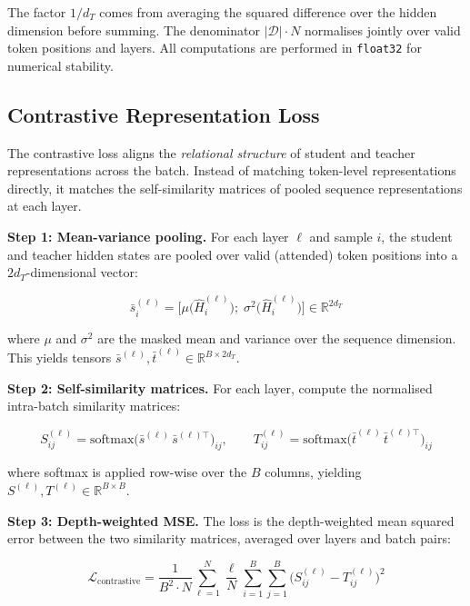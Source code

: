 \documentclass[11pt,a4paper]{article}
\begin{document}
The factor $1/d_T$ comes from averaging the squared difference over the hidden dimension before
summing.  The denominator $|\mathcal{D}| \cdot N$ normalises jointly over valid token positions and
layers.  All computations are performed in \texttt{float32} for numerical stability.

\subsection{Contrastive Representation Loss}
\label{sec:contrastive_loss}

The contrastive loss aligns the \emph{relational structure} of student and teacher representations
across the batch.  Instead of matching token-level representations directly, it matches the
self-similarity matrices of pooled sequence representations at each layer.

\textbf{Step 1: Mean-variance pooling.}
For each layer $\ell$ and sample $i$, the student and teacher hidden states are pooled over valid
(attended) token positions into a $2d_T$-dimensional vector:

\begin{equation}
  \bar{s}_i^{(\ell)} = \bigl[\mu\bigl(\hat{H}_i^{(\ell)}\bigr);\; \sigma^2\bigl(\hat{H}_i^{(\ell)}\bigr)\bigr]
  \in \mathbb{R}^{2d_T}
\end{equation}

where $\mu$ and $\sigma^2$ are the masked mean and variance over the sequence dimension.
This yields tensors $\bar{s}^{(\ell)}, \bar{t}^{(\ell)} \in \mathbb{R}^{B \times 2d_T}$.

\textbf{Step 2: Self-similarity matrices.}
For each layer, compute the normalised intra-batch similarity matrices:

\begin{equation}
  S_{ij}^{(\ell)} = \mathrm{softmax}\!\bigl(\bar{s}^{(\ell)}\,\bar{s}^{(\ell)\top}\bigr)_{ij},
  \qquad
  T_{ij}^{(\ell)} = \mathrm{softmax}\!\bigl(\bar{t}^{(\ell)}\,\bar{t}^{(\ell)\top}\bigr)_{ij}
\end{equation}

where softmax is applied row-wise over the $B$ columns, yielding
$S^{(\ell)}, T^{(\ell)} \in \mathbb{R}^{B \times B}$.

\textbf{Step 3: Depth-weighted MSE.}
The loss is the depth-weighted mean squared error between the two similarity matrices, averaged
over layers and batch pairs:

\begin{equation}
  \boxed{
    \mathcal{L}_{\mathrm{contrastive}} =
    \frac{1}{B^2 \cdot N}
    \sum_{\ell=1}^{N} \frac{\ell}{N}
    \sum_{i=1}^{B} \sum_{j=1}^{B}
    \bigl(S_{ij}^{(\ell)} - T_{ij}^{(\ell)}\bigr)^2
  }
\end{equation}
\end{document}
